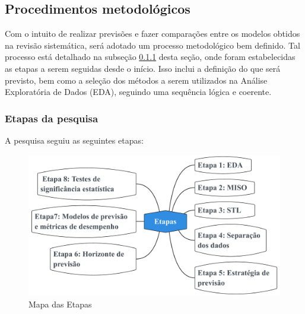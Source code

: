 \subsection{Procedimentos metodol{\'o}gicos} \label{subsec:metod}

Com o intuito de realizar previsões e fazer comparações entre os modelos obtidos na revisão sistemática, será adotado um processo metodológico bem definido. Tal processo está detalhado na subseção \ref{subsubsec:etp} desta seção, onde foram estabelecidas as etapas a serem seguidas desde o início. Isso inclui a definição do que será previsto, bem como a seleção dos métodos a serem utilizados na Análise Exploratória de Dados (EDA), seguindo uma sequência lógica e coerente.
   
    \subsubsection{Etapas da pesquisa}\label{subsubsec:etp}
    A pesquisa seguiu as seguintes etapas:
    \begin{figure}[H]
    	\centering
    	\caption{Mapa das Etapas}
    	\label{fig:etapas}
    	\includegraphics[width=0.9\linewidth]{Introducao/Figuras/Etapas}
    	
    \end{figure}
